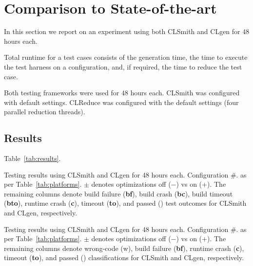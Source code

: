\section{Comparison to State-of-the-art}\label{sec:vs_clsmith}

In this section we report on an experiment using both CLSmith and CLgen for 48 hours each.

Total runtime for a test cases consists of the generation time, the time to execute the test harness on a configuration, and, if required, the time to reduce the test case.

Both testing frameworks were used for 48 hours each. CLSmith was configured with default settings. CLReduce was configured with the default settings (four parallel reduction threads).

\subsection{Results}

Table~\ref{tab:results}.

\begin{table}
	\scriptsize %
	\centering %
	
	\caption{Testing results using CLSmith and CLgen for 48 hours each. Configuration \#. as per Table~\ref{tab:platforms}. $\pm$ denotes optimizations off ($-$) vs on ($+$). The remaining columns denote build failure (\textbf{bf}), build crash (\textbf{bc}), build timeout (\textbf{bto}), runtime crash (\textbf{c}), timeout (\textbf{to}), and passed (\textbf{\cmark}) test outcomes for CLSmith and CLgen, respectively. }
	\label{tab:outcomes}
\end{table}

\begin{table}
	\scriptsize %
	\centering %
	
	\caption{Testing results using CLSmith and CLgen for 48 hours each. Configuration \#. as per Table~\ref{tab:platforms}. $\pm$ denotes optimizations off ($-$) vs on ($+$). The remaining columns denote wrong-code (w), build failure (\textbf{bf}), runtime crash (\textbf{c}), timeout (\textbf{to}), and passed (\textbf{\cmark}) classifications for CLSmith and CLgen, respectively. }
	\label{tab:results}
\end{table}


